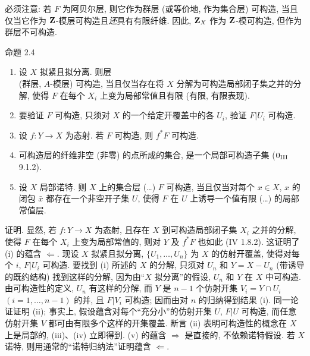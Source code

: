 必须注意: 若 $F$ 为阿贝尔层,
则它作为群层 (或等价地, 作为集合层) 可构造,
当且仅当它作为 $\mathbf{Z}$-模层可构造且\emph{还}具有有限纤维.
因此, $\mathbf{Z}_X$ 作为 $\mathbf{Z}$-模可构造, 但作为群层不可构造.

\begin{enonce*}{命题 2.4}
\begin{enumerate}
\renewcommand{\theenumi}{\roman{enumi}}
\renewcommand{\labelenumi}{(\theenumi)}
\item 设 $X$ 拟紧且拟分离.
则层 \\
(\resp 群层, \resp $A$-模层) 可构造,
当且仅当存在将 $X$ 分解为可构造局部闭子集之并的分解,
使得 $F$ 在每个 $X_i$ 上变为局部常值且有限
(\resp 有限, \resp 有限表现).

\item 要验证 $F$ 可构造, 只须对 $X$ 的一个给定开覆盖中的各 $U_i$,
验证 $F| U_i$ 可构造.

\item 设 $f:Y\rightarrow X$ 为态射.
若 $F$ 可构造, 则 $f^{\ast}F$ 可构造.

\item 可构造层的纤维非空 (\resp 非零) 的点所成\pageoriginale 的集合,
是一个局部可构造子集 {\rm (\EGA $0_{\rm III}$ 9.1.2)}.

\item 设 $X$ 局部诺特. 则 $X$ 上的集合层
(\resp\ldots) $F$ 可构造, 当且仅当对每个 $x\in X$,
$x$ 的闭包 $\bar{x}$ 都存在一个非空开子集 $U$,
使得 $F$ 在 $U$ 上诱导一个值有限 (\resp\ldots) 的局部常值层.
\end{enumerate}
\end{enonce*}

证明. 显然, 若 $f:Y\rightarrow X$ 为态射,
且存在 $X$ 到可构造局部闭子集 $X_i$ 之并的分解,
使得 $F$ 在每个 $X_i$ 上变为局部常值的,
则对 $Y$ 及 $f^{\ast}F$ 也如此 (\cf \EGA IV 1.8.2).
这证明了 (i) 的蕴含 $\Leftarrow$.
现设 $X$ 拟紧且拟分离, $\{U_1,\ldots,U_n\}$ 为 $X$ 的仿射开覆盖,
使得对每个 $i$, $F|U_i$ 可构造.
要找到 (i) 所述的 $X$ 的分解,
只须对 $U_n$ 和 $Y=X-U_n$ (带诱导的既约结构) 找到这样的分解,
因为由“$X$ 拟分离”的假设, $U_n$ 和 $Y$ 在 $X$ 中可构造.
由可构造性的定义, $U_n$ 有这样的分解,
而 $Y$ 是 $n-1$ 个仿射开集 $V_i=Y\cap U_i$ $(i=1,\ldots,n-1)$ 的并,
且 $F| V_i$ 可构造; 因而由对 $n$ 的归纳得到结果 (i).
同一论证证明 (ii); 事实上, 假设蕴含对每个“充分小”的仿射开集 $U$,
$F| U$ 可构造, 而任意仿射开集 $V$ 都可由有限多个这样的开集覆盖.
断言 (ii) 表明可构造性的概念在 $X$ 上是局部的,
(iii)、(iv) 立即得到.
(v) 的蕴含 $\Rightarrow$ 是直接的, 不依赖诺特假设.
若 $X$ 诺特, 则用通常的“诺特归纳法”证明蕴含 $\Leftarrow$.

